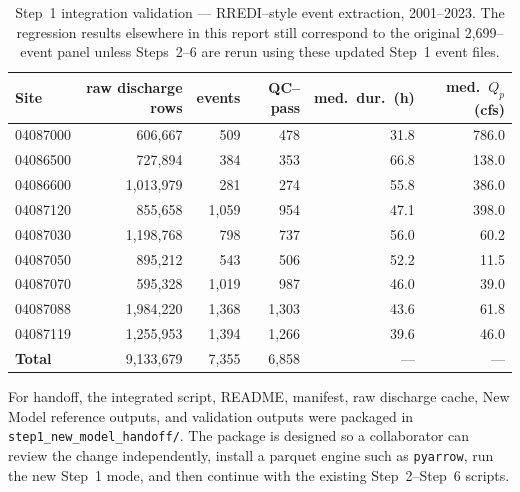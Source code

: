 \documentclass[11pt]{article}
\begin{document}
\begin{table}[htbp]\centering
\caption{Step~1 integration validation --- RREDI--style event extraction, 2001--2023.
The regression results elsewhere in this report still correspond to the original
2{,}699--event panel unless Steps~2--6 are rerun using these updated Step~1 event files.}
\label{tab:rredi-update}
\small
\begin{tabular}{lrrrrr}
\toprule
Site & raw discharge rows & events & QC--pass & med.\ dur.\ (h) & med.\ $Q_p$ (cfs) \\
\midrule
04087000 & 606{,}667  & 509  & 478  & 31.8 & 786.0 \\
04086500 & 727{,}894  & 384  & 353  & 66.8 & 138.0 \\
04086600 & 1{,}013{,}979 & 281 & 274 & 55.8 & 386.0 \\
04087120 & 855{,}658  & 1{,}059 & 954  & 47.1 & 398.0 \\
04087030 & 1{,}198{,}768 & 798 & 737 & 56.0 & 60.2 \\
04087050 & 895{,}212  & 543  & 506  & 52.2 & 11.5 \\
04087070 & 595{,}328  & 1{,}019 & 987  & 46.0 & 39.0 \\
04087088 & 1{,}984{,}220 & 1{,}368 & 1{,}303 & 43.6 & 61.8 \\
04087119 & 1{,}255{,}953 & 1{,}394 & 1{,}266 & 39.6 & 46.0 \\
\midrule
\textbf{Total} & 9{,}133{,}679 & 7{,}355 & 6{,}858 & --- & --- \\
\bottomrule
\end{tabular}
\end{table}

For handoff, the integrated script, README, manifest, raw discharge cache, New Model
reference outputs, and validation outputs were packaged in
\texttt{step1\_new\_model\_handoff/}. The package is designed so a collaborator can review
the change independently, install a parquet engine such as \texttt{pyarrow}, run the new
Step~1 mode, and then continue with the existing Step~2--Step~6 scripts.
\end{document}
